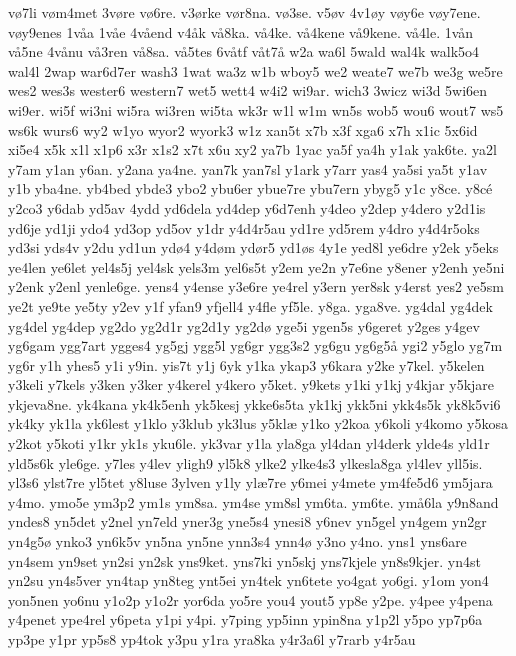 v^^f87li
v^^f8m4met
3v^^f8re
v^^f86re.
v3^^f8rke
v^^f8r8na.
v^^f83se.
v5^^f8v
4v1^^f8y
v^^f8y6e
v^^f8y7ene.
v^^f8y9enes
1v^^e5a
1v^^e5e
4v^^e5end
v4^^e5k
v^^e58ka.
v^^e54ke.
v^^e54kene
v^^e59kene.
v^^e54le.
1v^^e5n
v^^e55ne
4v^^e5nu
v^^e53ren
v^^e58sa.
v^^e55tes
6v^^e5tf
v^^e5t7^^e5
w2a
wa6l
5wald
wal4k
walk5o4
wal4l
2wap
war6d7er
wash3
1wat
wa3z
w1b
wboy5
we2
weate7
we7b
we3g
we5re
wes2
wes3s
wester6
western7
wet5
wett4
w4i2
wi9ar.
wich3
3wicz
wi3d
5wi6en
wi9er.
wi5f
wi3ni
wi5ra
wi3ren
wi5ta
wk3r
w1l
w1m
wn5s
wob5
wou6
wout7
ws5
ws6k
wurs6
wy2
w1yo
wyor2
wyork3
w1z
xan5t
x7b
x3f
xga6
x7h
x1ic
5x6id
xi5e4
x5k
x1l
x1p6
x3r
x1s2
x7t
x6u
xy2
ya7b
1yac
ya5f
ya4h
y1ak
yak6te.
ya2l
y7am
y1an
y6an.
y2ana
ya4ne.
yan7k
yan7sl
y1ark
y7arr
yas4
ya5si
ya5t
y1av
y1b
yba4ne.
yb4bed
ybde3
ybo2
ybu6er
ybue7re
ybu7ern
ybyg5
y1c
y8ce.
y8c^^e9
y2co3
y6dab
yd5av
4ydd
yd6dela
yd4dep
y6d7enh
y4deo
y2dep
y4dero
y2d1is
yd6je
yd1ji
ydo4
yd3op
yd5ov
y1dr
y4d4r5au
yd1re
yd5rem
y4dro
y4d4r5oks
yd3si
yds4v
y2du
yd1un
yd^^f84
y4d^^f8m
yd^^f8r5
yd1^^f8s
4y1e
yed8l
ye6dre
y2ek
y5eks
ye4len
ye6let
yel4s5j
yel4sk
yels3m
yel6s5t
y2em
ye2n
y7e6ne
y8ener
y2enh
ye5ni
y2enk
y2enl
yenle6ge.
yens4
y4ense
y3e6re
ye4rel
y3ern
yer8sk
y4erst
yes2
ye5sm
ye2t
ye9te
ye5ty
y2ev
y1f
yfan9
yfjell4
y4fle
yf5le.
y8ga.
yga8ve.
yg4dal
yg4dek
yg4del
yg4dep
yg2do
yg2d1r
yg2d1y
yg2d^^f8
yge5i
ygen5s
y6geret
y2ges
y4gev
yg6gam
ygg7art
ygges4
yg5gj
ygg5l
yg6gr
ygg3s2
yg6gu
yg6g5^^e5
ygi2
y5glo
yg7m
yg6r
y1h
yhes5
y1i
y9in.
yis7t
y1j
6yk
y1ka
ykap3
y6kara
y2ke
y7kel.
y5kelen
y3keli
y7kels
y3ken
y3ker
y4kerel
y4kero
y5ket.
y9kets
y1ki
y1kj
y4kjar
y5kjare
ykjeva8ne.
yk4kana
yk4k5enh
yk5kesj
ykke6s5ta
yk1kj
ykk5ni
ykk4s5k
yk8k5vi6
yk4ky
yk1la
yk6lest
y1klo
y3klub
yk3lus
y5kl^^e6
y1ko
y2koa
y6koli
y4komo
y5kosa
y2kot
y5koti
y1kr
yk1s
yku6le.
yk3var
y1la
yla8ga
yl4dan
yl4derk
ylde4s
yld1r
yld5s6k
yle6ge.
y7les
y4lev
yligh9
yl5k8
ylke2
ylke4s3
ylkesla8ga
yl4lev
yll5is.
yl3s6
ylst7re
yl5tet
y8luse
3ylven
y1ly
yl^^e67re
y6mei
y4mete
ym4fe5d6
ym5jara
y4mo.
ymo5e
ym3p2
ym1s
ym8sa.
ym4se
ym8sl
ym6ta.
ym6te.
ym^^e56la
y9n8and
yndes8
yn5det
y2nel
yn7eld
yner3g
yne5s4
ynesi8
y6nev
yn5gel
yn4gem
yn2gr
yn4g5^^f8
ynko3
yn6k5v
yn5na
yn5ne
ynn3s4
ynn4^^f8
y3no
y4no.
yns1
yns6are
yn4sem
yn9set
yn2si
yn2sk
yns9ket.
yns7ki
yn5skj
yns7kjele
yn8s9kjer.
yn4st
yn2su
yn4s5ver
yn4tap
yn8teg
ynt5ei
yn4tek
yn6tete
yo4gat
yo6gi.
y1om
yon4
yon5nen
yo6nu
y1o2p
y1o2r
yor6da
yo5re
you4
yout5
yp8e
y2pe.
y4pee
y4pena
y4penet
ype4rel
y6peta
y1pi
y4pi.
y7ping
yp5inn
ypin8na
y1p2l
y5po
yp7p6a
yp3pe
y1pr
yp5s8
yp4tok
y3pu
y1ra
yra8ka
y4r3a6l
y7rarb
y4r5au
